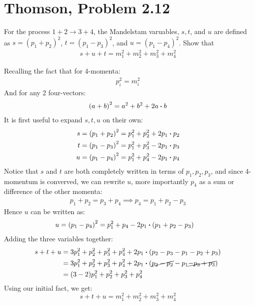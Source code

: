 \documentclass[12pt]{article}
\begin{document}
\section{Thomson, Problem 2.12}
\begin{problem}
  For the process $1+2\to3+4$, the Mandelstam varuables, $s,t$, and $u$ are defined as $s={(p_1+p_2)}^2$, $t={(p_1-p_3)}^2$, and $u={(p_1-p_4)}^2$. Show that
  \begin{align*}
    s+u+t=m_1^2+m_2^2+m_3^2+m_4^2
  \end{align*}
\end{problem}
Recalling the fact that for 4-momenta:
\begin{align*}
  p_i^2=m_i^2
\end{align*}
And for any 2 four-vectors:
\begin{align*}
  {(a+b)}^2=a^2+b^2+2a\vdot b
\end{align*}
It is first useful to expand $s,t,u$ on their own:
\begin{align*}
  s &= {(p_1+p_2)}^2= p_1^2+p_2^2+2p_1\vdot p_2\\
  t &= {(p_1-p_3)}^2= p_1^2+p_3^2-2p_1\vdot p_3\\
  u &= {(p_1-p_4)}^2= p_1^2+p_4^2-2p_1\vdot p_4
\end{align*}
Notice that $s$ and $t$ are both completely written in terms of $p_1,p_2,p_3$, and since 4-momentum is converved, we can rewrite $u$, more importantly $p_4$ as a sum or difference of the other momenta:
\begin{align*}
  p_1+p_2=p_3+p_4\implies p_4=p_1+p_2-p_3
\end{align*}
Hence $u$ can be written as:
\begin{align*}
  u &= {(p_1-p_4)}^2= p_1^2+p_4-2p_1\vdot(p_1+p_2-p_3)
\end{align*}
Adding the three variables together:
\begin{align*}
  s+t+u &= 3p_1^2+p_2^2+p_3^2+p_4^2+2p_1\vdot(p_2-p_3-p_1-p_2+p_3)\\
  &= 3p_1^2+p_2^2+p_3^2+p_4^2+2p_1\vdot(\cancel{p_2-p_2}-p_1\cancel{-p_3+p_3})\\
  &=(3-2)p_1^2+p_2^2+p_3^2+p_4^2
\end{align*}
Using our initial fact, we get:
\begin{equation}
  \label{eq:p7}
  \boxed{s+t+u=m_1^2+m_2^2+m_3^2+m_4^2}
\end{equation}
\end{document}
